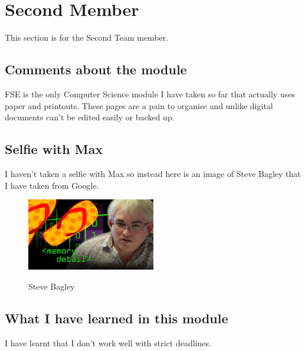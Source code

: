 \section{Second Member}
This section is for the Second Team member. 


\subsection{Comments about the module}
FSE is the only Computer Science module I have taken so far that actually uses paper and printouts. These pages are a pain to organise and unlike digital documents can't be edited easily or backed up. 

\subsection{Selfie with Max}

I haven't taken a selfie with Max so instead here is an image of Steve Bagley that I have taken from Google.  

\begin{figure}[h]
\caption{Steve Bagley}
\centering
\includegraphics[width=0.5\textwidth]{Bagley.jpg}
\label{fig:selfie}
\end{figure}



\subsection{What I have learned in this module}
I have learnt that I don't work well with strict deadlines. 

